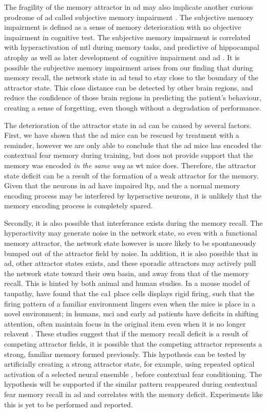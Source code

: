 The fragility of the memory attractor in \gls{ad} may also implicate another curious prodrome of \gls{ad} called subjective memory impairment \citep{jahn13}. The subjective memory impairment is defined as a sense of memory deterioration with no objective impairment in cognitive test. The subjective memory impairment is correlated with hyperactivation of \gls{mtl} during memory tasks, and predictive of hippocampal atrophy as well as later development of cognitive impairment and \gls{ad} \citep{jahn13}. It is possible the subjective memory impairment arises from our finding that during memory recall, the network state in \gls{ad} tend to stay close to the boundary of the attractor state. This close distance can be detected by other brain regions, and reduce the confidence of those brain regions in predicting the patient's behaviour, creating a sense of forgetting, even though without a degradation of performance.  

The deterioration of the attractor state in \gls{ad} can be caused by several factors. First, we have shown that the \gls{ad} mice can be rescued by \tglu{} treatment with a reminder, however we are only able to conclude that the \gls{ad} mice has encoded the contextual fear memory during training, but does not provide support that the memory was encoded \textit{in the same way} as \gls{wt} mice does. Therefore, the attractor state deficit can be a result of the formation of a weak attractor for the memory. Given that the neurons in \gls{ad} have impaired \gls{ltp}, and the a normal memory encoding process may be interfered by hyperactive neurons, it is unlikely that the memory encoding process is completely spared. 

Secondly, it is also possible that interferance exists during the memory recall. The hyperactivity may generate noise in the network state, so even with a functional memory attractor, the network state however is more likely to be spontaneously bumped out of the attractor field by noise. In addition, it is also possible that in \gls{ad}, other attractor states exists, and these sporadic attractors may actively pull the network state toward their own basin, and away from that of the memory recall. This is hinted by both animal and human studies. In a mouse model of taupathy, \citet{cheng13} have found that the \gls{ca1} place cells displays rigid firing, such that the firing pattern of a familiar environment lingers even when the mice is place in a novel environment; in humans, \gls{mci} and early \gls{ad} patients have deficits in shifting attention, often maintain focus in the original item even when it is no longer relavent \citep{perry99}. These studies suggest that if the memory recall deficit is a result of competing attractor fields, it is possible that the competing attractor represents a strong, familiar memory formed previously. This hypothesis can be tested by artificially creating a strong attractor state, for example, using repeated optical activation of a selected neural ensemble \citep{carrillo-reid16}, before contextual fear conditioning. The hypothesis will be supported if the similar pattern reappeared during centextual fear memory recall in \gls{ad} and correlates with the memory deficit. Experiments like this is yet to be performed and reported.  

